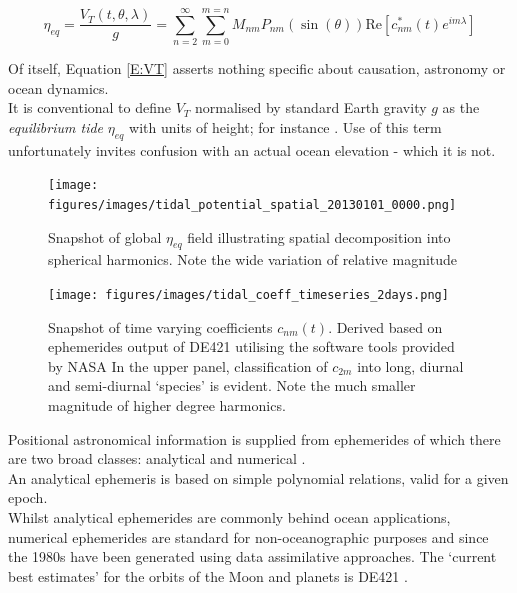 \begin{equation}
\label{E:VT}
\eta_{eq} = \frac{V_T(t,\theta,\lambda) }{g} = \sum_{n=2}^{\infty} \sum_{m=0}^{m=n} M_{nm} P_{nm}( \sin(\theta) ) \text{Re} \left [ c^{*}_{nm}(t) e^{im\lambda} \right ]
\end{equation}

Of itself, Equation \ref{E:VT} asserts nothing specific about causation, astronomy or ocean dynamics.\\
It is conventional to define $V_T$ normalised by standard Earth gravity $g$ as the \emph{equilibrium tide} $\eta_{eq}$ with units of height; for instance \cite[Eq 9.8.3]{gill1982atmosphere}. Use of this term unfortunately invites confusion with an actual ocean elevation - which it is not.\\


\begin{figure}[h]
\begin{center}
\texttt{[image: figures/images/tidal\_potential\_spatial\_20130101\_0000.png]}
\caption{Snapshot of global $\eta_{eq}$ field illustrating spatial decomposition into spherical harmonics.  Note the wide variation of relative magnitude}
\label{fig:VT_EG}
\end{center}
\end{figure}


\begin{figure}[h]
\begin{center}
\texttt{[image: figures/images/tidal\_coeff\_timeseries\_2days.png]}
\caption{Snapshot of time varying coefficients $c_{nm}(t)$. Derived based on ephemerides output of DE421 utilising the software tools provided by NASA \cite[p]{Anonymous:vo}  In the upper panel, classification of $c_{2m}$ into long, diurnal and semi-diurnal `species' is evident.  Note the much smaller magnitude of higher degree harmonics.}
\end{center}
\end{figure}

Positional astronomical information is supplied from ephemerides \citep[Section 8.1]{Urban:2013vl} of which there are two broad classes: analytical and numerical \citep{Wenzel:1997kn}.\\
An analytical ephemeris is based on simple polynomial relations, valid for a given epoch.\\
Whilst analytical ephemerides are commonly behind ocean applications, numerical ephemerides are standard for non-oceanographic purposes and since the 1980s have been generated using data assimilative approaches\cite[sec 8.1]{Urban:2013vl}. The `current best estimates' for the orbits of the Moon and planets is DE421 \citep{Folkner:2008wm}. \\


